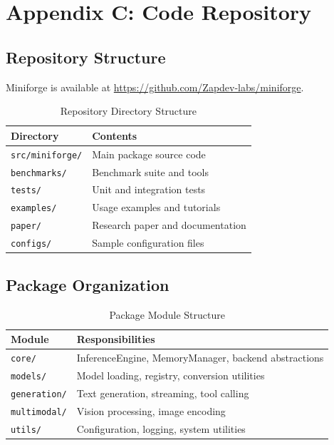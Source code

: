 \section{Appendix C: Code Repository}
\label{appendix:code}

\subsection{Repository Structure}

Miniforge is available at \url{https://github.com/Zapdev-labs/miniforge}.

\begin{table}[h]
\centering
\caption{Repository Directory Structure}
\label{tab:repo_structure}
\begin{tabular}{ll}
\toprule
\textbf{Directory} & \textbf{Contents} \\
\midrule
\texttt{src/miniforge/} & Main package source code \\
\texttt{benchmarks/} & Benchmark suite and tools \\
\texttt{tests/} & Unit and integration tests \\
\texttt{examples/} & Usage examples and tutorials \\
\texttt{paper/} & Research paper and documentation \\
\texttt{configs/} & Sample configuration files \\
\bottomrule
\end{tabular}
\end{table}

\subsection{Package Organization}

\begin{table}[h]
\centering
\caption{Package Module Structure}
\label{tab:package_modules}
\begin{tabular}{ll}
\toprule
\textbf{Module} & \textbf{Responsibilities} \\
\midrule
\texttt{core/} & InferenceEngine, MemoryManager, backend abstractions \\
\texttt{models/} & Model loading, registry, conversion utilities \\
\texttt{generation/} & Text generation, streaming, tool calling \\
\texttt{multimodal/} & Vision processing, image encoding \\
\texttt{utils/} & Configuration, logging, system utilities \\
\bottomrule
\end{tabular}
\end{table}

